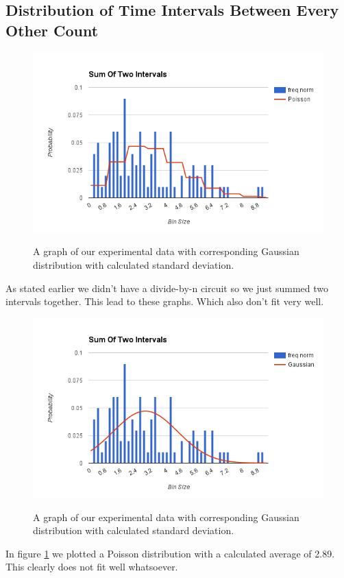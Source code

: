 \documentclass[12pt letterpaper]{article}
\begin{document}
\subsection*{Distribution of Time Intervals Between Every Other Count}

\begin{figure}[H]
  \caption{A graph of our experimental data with corresponding Gaussian distribution with calculated standard deviation.}
  \centering
    \includegraphics[width=.75\textwidth]{section1_2_2_poisson.png}
    \label{fig:section1.2.2poisson}
\end{figure}

As stated earlier we didn't have a divide-by-n circuit so we just summed two intervals together. This lead to these graphs. Which also don't fit very well.

\begin{figure}[H]
  \caption{A graph of our experimental data with corresponding Gaussian distribution with calculated standard deviation.}
  \centering
    \includegraphics[width=.75\textwidth]{section1_2_2_gaussian.png}
    \label{fig:section1.2.2gaussian}
\end{figure}

In figure \ref{fig:section1.2.2poisson} we plotted a Poisson distribution with a calculated average of 2.89. This clearly does not fit well whatsoever. 
\end{document}
